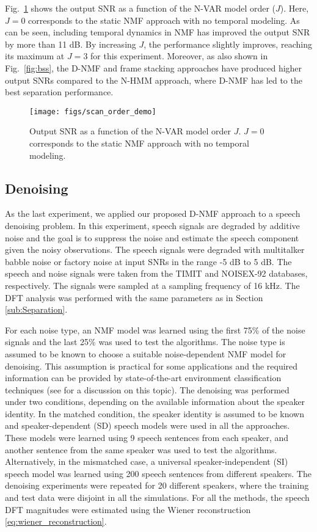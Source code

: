 \documentclass[10pt,twocolumn,twoside] {IEEEtran}
\begin{document}
Fig.~\ref{fig:bss_order} shows the output SNR as a function of the N-VAR model order ($J$). Here, $J=0$ corresponds to the static NMF approach with no temporal modeling. As can be seen, including temporal dynamics in NMF has improved the output SNR by more than 11 dB. By increasing $J$, the performance slightly improves, reaching its maximum at $J=3$ for this experiment. Moreover, as also shown in Fig.~\ref{fig:bss}, the D-NMF and frame stacking approaches have produced higher output SNRs compared to the N-HMM approach, where D-NMF has led to the best separation performance.

\begin{figure}
\texttt{[image: figs/scan\_order\_demo]}\caption{\label{fig:bss_order} Output SNR as a function of the N-VAR model order $J$. $J=0$ corresponds to the static NMF approach with no temporal modeling.}
\end{figure}


\subsection{Denoising\label{sub:Denoising}}
As the last experiment, we applied our proposed D-NMF approach to a speech
denoising problem. In this experiment, speech signals are degraded
by additive noise and the goal is to suppress the noise and estimate
the speech component given the noisy observations. The speech signals were degraded with multitalker babble noise
or factory noise at input SNRs in the range -5 dB to 5 dB. The speech and noise signals were taken from the TIMIT \cite{Garofolo1993} and NOISEX-92 \cite{noisex92} databases, respectively. The signals were
sampled at a sampling frequency of 16 kHz. The DFT analysis was performed with the same parameters as in Section \ref{sub:Separation}.

For each noise type, an NMF model was learned using the first 75\% of the noise signals and the last 25\% was used to test the algorithms. The noise type is assumed to be known to choose a suitable noise-dependent NMF model for denoising. This assumption is practical for some applications and the required information can be provided by state-of-the-art environment classification techniques (see \cite{Mohammadiha2013d} for a discussion on this topic). The denoising was performed under two conditions, depending on the available information about the speaker identity. In the matched condition, the speaker identity is assumed to be known and speaker-dependent (SD) speech models were used in all the approaches. These models were learned using 9 speech sentences from each speaker, and another sentence from the same speaker was used to test the algorithms. Alternatively, in the mismatched case, a universal speaker-independent (SI) speech model was learned using 200 speech sentences from different speakers. The denoising experiments were repeated for 20 different speakers, where the training and test data were disjoint in all the simulations. For all the methods, the speech DFT magnitudes were estimated using the Wiener reconstruction \eqref{eq:wiener_reconstruction}.
\end{document}
